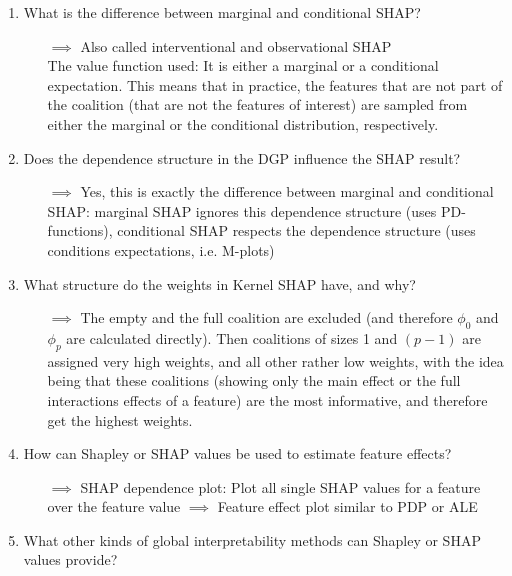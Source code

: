 \begin{enumerate}
\begin{itemize}
    \end{itemize}
    \item What is the difference between marginal and conditional SHAP?
    \begin{itemize}
        \item[$\implies$] Also called interventional and observational SHAP \\ The value function used: It is either a marginal or a conditional expectation. This means that in practice, the features that are not part of the coalition (that are not the features of interest) are sampled from either the marginal or the conditional distribution, respectively.
    \end{itemize}
    \item Does the dependence structure in the DGP influence the SHAP result?
    \begin{itemize}
        \item[$\implies$] Yes, this is exactly the difference between marginal and conditional SHAP: marginal SHAP ignores this dependence structure (uses PD-functions), conditional SHAP respects the dependence structure (uses conditions expectations, i.e. M-plots)
    \end{itemize}
    \item What structure do the weights in Kernel SHAP have, and why?
    \begin{itemize}
        \item[$\implies$] The empty and the full coalition are excluded (and therefore $\phi_0$ and $\phi_{p}$ are calculated directly). Then coalitions of sizes 1 and $(p-1)$ are assigned very high weights, and all other rather low weights, with the idea being that these coalitions (showing only the main effect or the full interactions effects of a feature) are the most informative, and therefore get the highest weights.
    \end{itemize}
    \item How can Shapley or SHAP values be used to estimate feature effects?
    \begin{itemize}
        \item[$\implies$] SHAP dependence plot: Plot all single SHAP values for a feature over the feature value $\implies$ Feature effect plot similar to PDP or ALE
    \end{itemize}
    \item What other kinds of global interpretability methods can Shapley or SHAP values provide?

\end{enumerate}
